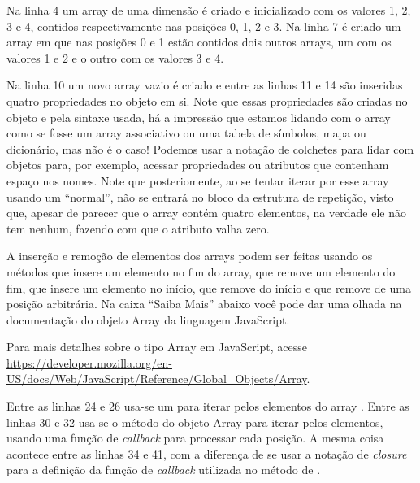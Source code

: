Na linha 4 um array de uma dimensão é criado e inicializado com os valores 1, 2, 3 e 4, contidos respectivamente nas posições 0, 1, 2 e 3. Na linha 7 é criado um array em que nas posições 0 e 1 estão contidos dois outros arrays, um com os valores 1 e 2 e o outro com os valores 3 e 4.

Na linha 10 um novo array vazio é criado e entre as linhas 11 e 14 são inseridas quatro propriedades no objeto em si. Note que essas propriedades são criadas no objeto e pela sintaxe usada, há a impressão que estamos lidando com o array como se fosse um array associativo ou uma tabela de símbolos, mapa ou dicionário, mas não é o caso! Podemos usar a notação de colchetes para lidar com objetos para, por exemplo, acessar propriedades ou atributos que contenham espaço nos nomes. Note que posteriomente, ao se tentar iterar por esse array usando um  ``normal'', não se entrará no bloco da estrutura de repetição, visto que, apesar de parecer que o array contém quatro elementos, na verdade ele não tem nenhum, fazendo com que o atributo  valha zero.

A inserção e remoção de elementos dos arrays podem ser feitas usando os métodos  que insere um elemento no fim do array,  que remove um elemento do fim,  que insere um elemento no início,  que remove do início e  que remove de uma posição arbitrária. Na caixa ``Saiba Mais'' abaixo você pode dar uma olhada na documentação do objeto Array da linguagem JavaScript.

\begin{saibaMais}
    Para mais detalhes sobre o tipo Array em JavaScript, acesse \url{https://developer.mozilla.org/en-US/docs/Web/JavaScript/Reference/Global_Objects/Array}.
\end{saibaMais}

Entre as linhas 24 e 26 usa-se um  para iterar pelos elementos do array . Entre as linhas 30 e 32 usa-se o método  do objeto Array para iterar pelos elementos, usando uma função de \textit{callback} para processar cada posição. A mesma coisa acontece entre as linhas 34 e 41, com a diferença de se usar a notação de \textit{closure} para a definição da função de \textit{callback} utilizada no método  de .

